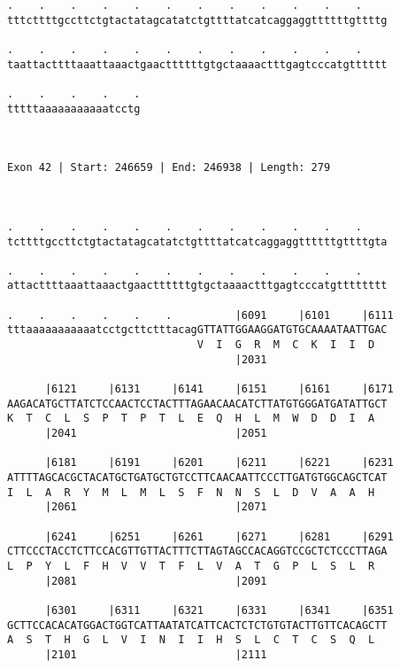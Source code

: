 \documentclass{article}
\begin{document}
\begin{Verbatim}
.    .    .    .    .    .    .    .    .    .    .    .    
tttcttttgccttctgtactatagcatatctgttttatcatcaggaggttttttgttttg
                                                            
.    .    .    .    .    .    .    .    .    .    .    .    
taattacttttaaattaaactgaacttttttgtgctaaaactttgagtcccatgtttttt
                                                            
.    .    .    .    .
tttttaaaaaaaaaaatcctg
                     
                     
 
Exon 42 | Start: 246659 | End: 246938 | Length: 279



.    .    .    .    .    .    .    .    .    .    .    .    
tcttttgccttctgtactatagcatatctgttttatcatcaggaggttttttgttttgta
                                                            
.    .    .    .    .    .    .    .    .    .    .    .    
attacttttaaattaaactgaacttttttgtgctaaaactttgagtcccatgtttttttt
                                                            
.    .    .    .    .    .          |6091     |6101     |6111
tttaaaaaaaaaaatcctgcttctttacagGTTATTGGAAGGATGTGCAAAATAATTGAC
                              V  I  G  R  M  C  K  I  I  D  
                                    |2031                   
  
      |6121     |6131     |6141     |6151     |6161     |6171
AAGACATGCTTATCTCCAACTCCTACTTTAGAACAACATCTTATGTGGGATGATATTGCT
K  T  C  L  S  P  T  P  T  L  E  Q  H  L  M  W  D  D  I  A  
      |2041                         |2051                   
  
      |6181     |6191     |6201     |6211     |6221     |6231
ATTTTAGCACGCTACATGCTGATGCTGTCCTTCAACAATTCCCTTGATGTGGCAGCTCAT
I  L  A  R  Y  M  L  M  L  S  F  N  N  S  L  D  V  A  A  H  
      |2061                         |2071                   
  
      |6241     |6251     |6261     |6271     |6281     |6291
CTTCCCTACCTCTTCCACGTTGTTACTTTCTTAGTAGCCACAGGTCCGCTCTCCCTTAGA
L  P  Y  L  F  H  V  V  T  F  L  V  A  T  G  P  L  S  L  R  
      |2081                         |2091                   
  
      |6301     |6311     |6321     |6331     |6341     |6351
GCTTCCACACATGGACTGGTCATTAATATCATTCACTCTCTGTGTACTTGTTCACAGCTT
A  S  T  H  G  L  V  I  N  I  I  H  S  L  C  T  C  S  Q  L  
      |2101                         |2111                   
  

\end{Verbatim}
\end{document}
